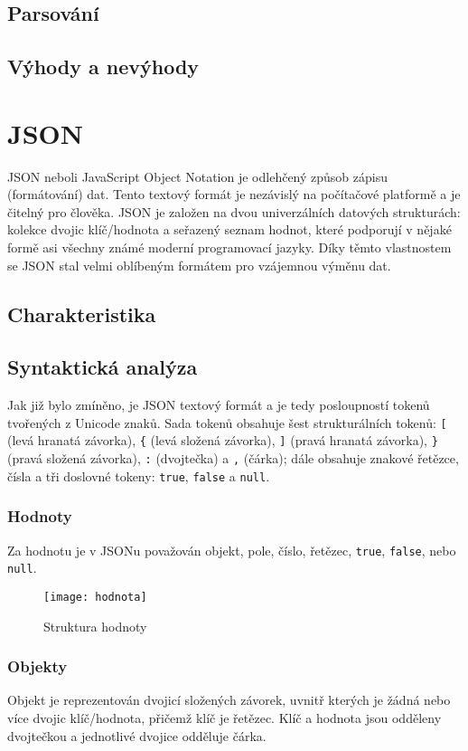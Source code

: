\subsection{Parsování}
\subsection{Výhody a nevýhody}
\section{JSON}
JSON neboli JavaScript Object Notation je odlehčený způsob zápisu (formátování) dat. Tento textový formát je nezávislý na počítačové platformě a je čitelný pro člověka. JSON je založen na dvou univerzálních datových strukturách: kolekce dvojic klíč/hodnota a seřazený seznam hodnot, které podporují v nějaké formě asi všechny známé moderní programovací jazyky. Díky těmto vlastnostem se JSON stal velmi oblíbeným formátem pro vzájemnou výměnu dat.

\subsection{Charakteristika}

\subsection{Syntaktická analýza}
Jak již bylo zmíněno, je JSON textový formát a je tedy posloupností tokenů tvořených z Unicode znaků. Sada tokenů obsahuje šest strukturálních tokenů: \texttt{[} (levá hranatá závorka), \texttt{\{} (levá složená závorka), \texttt{]} (pravá hranatá závorka), \texttt{\}} (pravá složená závorka), \texttt{:} (dvojtečka) a \texttt{,} (čárka); dále obsahuje znakové řetězce, čísla a tři doslovné tokeny: \texttt{true}, \texttt{false} a \texttt{null}.

\subsubsection{Hodnoty}
Za hodnotu je v JSONu považován objekt, pole, číslo, řetězec, \texttt{true}, \texttt{false}, nebo \texttt{null}.

\begin{figure}[!htb]
\centering
\texttt{[image: hodnota]}
\caption{Struktura hodnoty}
\label{hodnota}
\end{figure}

\subsubsection{Objekty}
Objekt je reprezentován dvojicí složených závorek, uvnitř kterých je žádná nebo více dvojic klíč/hodnota, přičemž klíč je řetězec. Klíč a hodnota jsou odděleny dvojtečkou a jednotlivé dvojice odděluje čárka.

